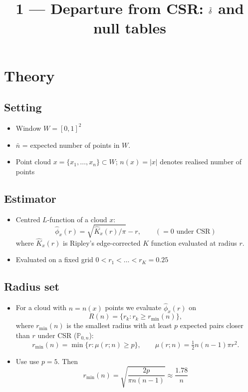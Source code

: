\documentclass[11pt]{article}
\title{1 --- Departure from CSR: $\tilde\delta$ and null tables}
\date{}
\newcommand{\nb}{\bar n}
\begin{document}
\maketitle

\section{Theory}

\subsection*{Setting}
\begin{itemize}
  \item Window $W=[0,1]^2$
  \item $\nb$ = expected number of points in $W$.
  \item Point cloud $x = \{x_1,\dots,x_n\} \subset W$; $n(x) = |x|$ denotes realised number of points
\end{itemize}

\subsection*{Estimator}
\begin{itemize}
  \item Centred $L$-function of a cloud $x$:
  \[
    \hat\phi_x(r) = \sqrt{\hat K_x(r)/\pi} - r,
    \qquad
    (= 0 \text{ under CSR})
  \]
  where $\hat K_x(r)$ is Ripley's edge-corrected $K$ function evaluated at radius $r$.
  \item Evaluated on a fixed grid $0<r_1<\dots<r_K=0.25$
\end{itemize}

\subsection*{Radius set}
\begin{itemize}
    \item For a cloud with $n = n(x)$ points we evaluate $\hat\phi_x(r)$ on
        \[
        R(n) = \{r_k : r_k \ge r_{\min}(n)\},
        \]
    where $r_{\min}(n)$ is the smallest radius with at least $p$ expected pairs closer than $r$ under CSR ($\mathbb P_{0,n}$):
        \[
        r_{\min}(n) = \min\{r : \mu(r;n) \ge p\},
        \qquad
        \mu(r;n) = \tfrac12 n(n-1)\pi r^2 .
        \]
    \item Use use $p=5$. Then
        \[
        r_{\min}(n) = \sqrt{\frac{2p}{\pi n(n-1)}} \approx \frac{1.78}{n}
        \]
\end{itemize}
\end{document}
